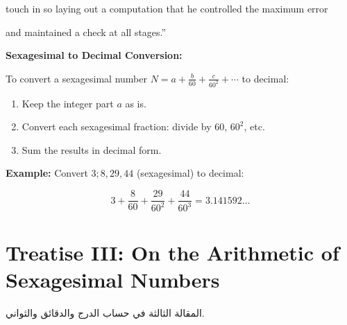 \documentclass[11pt,a4paper]{article}
\newenvironment{arabicbox}{%

  \begin{framed}

  \begin{minipage}{\linewidth-2\fboxsep-2\fboxrule}

  \setlength{\parindent}{0pt}

  \linespread{1.3}\selectfont

}{%

  \end{minipage}

  \end{framed}

}
\newenvironment{mathalgo}{%

  \par\vspace{0.3cm}

  \begin{framed}

  \setlength{\parindent}{0pt}

}{%

  \end{framed}

  \par\vspace{0.3cm}

}
\begin{document}
touch in so laying out a computation that he controlled the maximum error

and maintained a check at all stages.''



\begin{mathalgo}

\textbf{Sexagesimal to Decimal Conversion:}



To convert a sexagesimal number $N = a + \frac{b}{60} +

\frac{c}{60^2} + \cdots$ to decimal:

\begin{enumerate}[nosep]

  \item Keep the integer part $a$ as is.

  \item Convert each sexagesimal fraction: divide by $60$, $60^2$, etc.

  \item Sum the results in decimal form.

\end{enumerate}



\textbf{Example:} Convert $3; 8, 29, 44$ (sexagesimal) to decimal:

\[

3 + \frac{8}{60} + \frac{29}{60^2} + \frac{44}{60^3} = 3.141592\ldots

\]

\end{mathalgo}

\clearpage








\section{Treatise III: On the Arithmetic of Sexagesimal Numbers}

\label{sec:treatise3}



\begin{arabicbox}

\begin{Arabic}

المقالة الثالثة في حساب الدرج والدقائق والثواني.

\end{Arabic}

\end{arabicbox}
\end{document}
